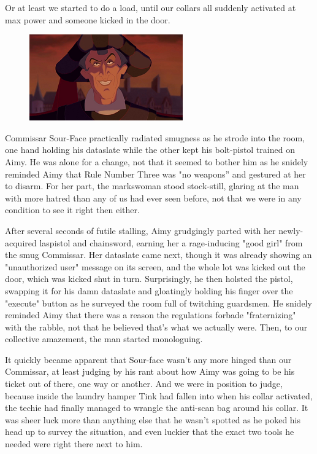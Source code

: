 Or at least we started to do a load, until our collars all suddenly activated at max power and someone kicked in the door.

\begin{figure}
	\begin{center}
		\includegraphics[width=\figwidth]{pics/21/63.png}
	\end{center}
\end{figure}
Commissar Sour-Face practically radiated smugness as he strode into the room, one hand holding his dataslate while the other kept his bolt-pistol trained on Aimy. 
He was alone for a change, not that it seemed to bother him as he snidely reminded Aimy that Rule Number Three was "no weapons'' and gestured at her to disarm. 
For her part, the markswoman stood stock-still, glaring at the man with more hatred than any of us had ever seen before, not that we were in any condition to see it right then either.

After several seconds of futile stalling, Aimy grudgingly parted with her newly-acquired laspistol and chainsword, earning her a rage-inducing "good girl" from the smug Commissar. 
Her dataslate came next, though it was already showing an "unauthorized user" message on its screen, and the whole lot was kicked out the door, which was kicked shut in turn. 
Surprisingly, he then holsted the pistol, swapping it for his damn dataslate and gloatingly holding his finger over the "execute" button as he surveyed the room full of twitching guardsmen. 
He snidely reminded Aimy that there was a reason the regulations forbade "fraternizing" with the rabble, not that he believed that's what we actually were. 
Then, to our collective amazement, the man started monologuing.

It quickly became apparent that Sour-face wasn't any more hinged than our Commissar, at least judging by his rant about how Aimy was going to be his ticket out of there, one way or another. 
And we were in position to judge, because inside the laundry hamper Tink had fallen into when his collar activated, the techie had finally managed to wrangle the anti-scan bag around his collar. 
It was sheer luck more than anything else that he wasn't spotted as he poked his head up to survey the situation, and even luckier that the exact two tools he needed were right there next to him.

